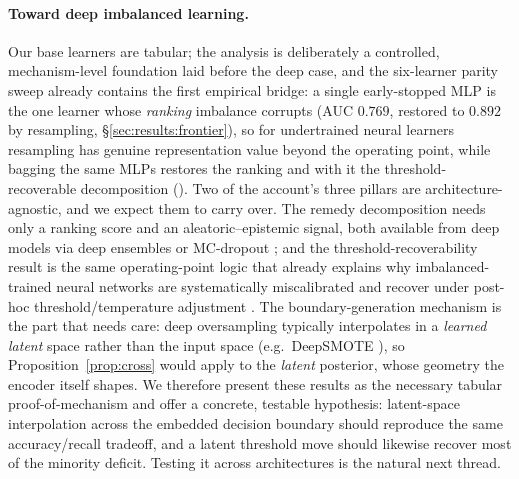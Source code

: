 \paragraph{Toward deep imbalanced learning.} Our base learners are tabular;
the analysis is
deliberately a controlled, mechanism-level foundation laid before the deep case,
and the six-learner parity sweep already contains the first empirical bridge: a
single early-stopped MLP is the one learner whose \emph{ranking} imbalance
corrupts (AUC $0.769$, restored to $0.892$ by resampling,
\S\ref{sec:results:frontier}), so for undertrained neural learners resampling
has genuine representation value beyond the operating point, while bagging the
same MLPs restores the ranking and with it the threshold-recoverable
decomposition (). Two
of the account's three pillars are architecture-agnostic, and we expect them to carry over. The
remedy decomposition needs only a ranking score and an aleatoric--epistemic signal,
both available from deep models via deep ensembles or MC-dropout
\cite{lakshminarayanan2017simple}; and the threshold-recoverability result is the same
operating-point logic that already explains why imbalanced-trained neural networks are
systematically miscalibrated and recover under post-hoc threshold/temperature
adjustment \cite{guo2017calibration}. The boundary-generation mechanism is the part
that needs care: deep oversampling typically interpolates in a \emph{learned latent}
space rather than the input space (e.g.\ DeepSMOTE \cite{dablain2022deepsmote}), so
Proposition~\ref{prop:cross} would apply to the \emph{latent} posterior, whose geometry
the encoder itself shapes. We therefore present these results as the necessary tabular
proof-of-mechanism and offer a concrete, testable hypothesis: latent-space
interpolation across the embedded decision boundary should reproduce the same
accuracy/recall tradeoff, and a latent threshold move should likewise recover most of
the minority deficit. Testing it across architectures is the natural next thread.

